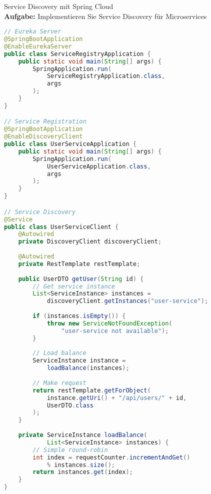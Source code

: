 \begin{example2}{Service Discovery mit Spring Cloud}\\
\textbf{Aufgabe:} Implementieren Sie Service Discovery für Microservices

\begin{lstlisting}[language=Java, style=base]
// Eureka Server
@SpringBootApplication
@EnableEurekaServer
public class ServiceRegistryApplication {
    public static void main(String[] args) {
        SpringApplication.run(
            ServiceRegistryApplication.class, 
            args
        );
    }
}

// Service Registration
@SpringBootApplication
@EnableDiscoveryClient
public class UserServiceApplication {
    public static void main(String[] args) {
        SpringApplication.run(
            UserServiceApplication.class, 
            args
        );
    }
}

// Service Discovery
@Service
public class UserServiceClient {
    @Autowired
    private DiscoveryClient discoveryClient;
    
    @Autowired
    private RestTemplate restTemplate;
    
    public UserDTO getUser(String id) {
        // Get service instance
        List<ServiceInstance> instances = 
            discoveryClient.getInstances("user-service");
            
        if (instances.isEmpty()) {
            throw new ServiceNotFoundException(
                "user-service not available");
        }
        
        // Load balance
        ServiceInstance instance = 
            loadBalance(instances);
            
        // Make request
        return restTemplate.getForObject(
            instance.getUri() + "/api/users/" + id,
            UserDTO.class
        );
    } 
    
    private ServiceInstance loadBalance(
            List<ServiceInstance> instances) {
        // Simple round-robin
        int index = requestCounter.incrementAndGet() 
            % instances.size();
        return instances.get(index);
    }
}
\end{lstlisting}
\end{example2}